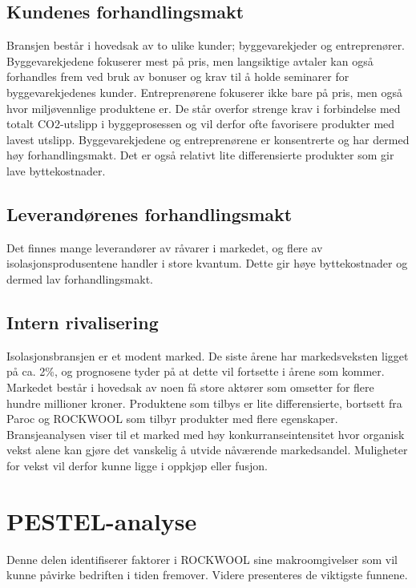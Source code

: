 \subsection{Kundenes forhandlingsmakt}
Bransjen består i hovedsak av to ulike kunder; byggevarekjeder og entreprenører. Byggevarekjedene fokuserer mest på pris, men langsiktige avtaler kan også forhandles frem ved bruk av bonuser og krav til å holde seminarer for byggevarekjedenes kunder. Entreprenørene fokuserer ikke bare på pris, men også hvor miljøvennlige produktene er. De står overfor strenge krav i forbindelse med totalt CO2-utslipp i byggeprosessen og vil derfor ofte favorisere produkter med lavest utslipp. Byggevarekjedene og entreprenørene er konsentrerte og har dermed høy forhandlingsmakt. Det er også relativt lite differensierte produkter som gir lave byttekostnader.

\subsection{Leverandørenes forhandlingsmakt}
Det finnes mange leverandører av råvarer i markedet, og flere av isolasjonsprodusentene handler i store kvantum. Dette gir høye byttekostnader og dermed lav forhandlingsmakt.

\subsection{Intern rivalisering}
Isolasjonsbransjen er et modent marked. De siste årene har markedsveksten ligget på ca. 2\%, og prognosene tyder på at dette vil fortsette i årene som kommer. Markedet består i hovedsak av noen få store aktører som omsetter for flere hundre millioner kroner. Produktene som tilbys er lite differensierte, bortsett fra Paroc og ROCKWOOL som tilbyr produkter med flere egenskaper. Bransjeanalysen viser til et marked med høy konkurranseintensitet hvor organisk vekst alene kan gjøre det vanskelig å utvide nåværende markedsandel. Muligheter for vekst vil derfor kunne ligge i oppkjøp eller fusjon.

\section{PESTEL-analyse}
Denne delen identifiserer faktorer i ROCKWOOL sine makroomgivelser som vil kunne påvirke bedriften i tiden fremover. Videre presenteres de viktigste funnene.


